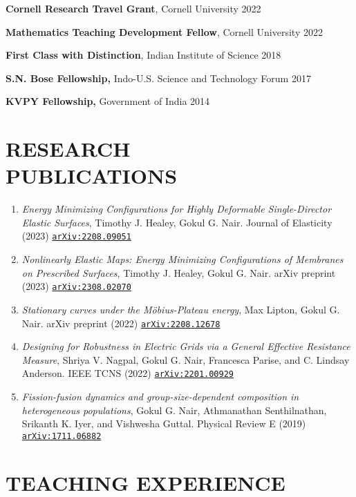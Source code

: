 \documentclass[margin]{res} %
\begin{document}
\begin{resume}
{\bf Cornell Research Travel Grant}, Cornell University \hfill2022

{\bf Mathematics Teaching Development Fellow}, Cornell University \hfill2022

{\bf First Class with Distinction}, Indian Institute of Science \hfill2018

{\bf S.N. Bose Fellowship,} Indo-U.S. Science and Technology Forum \hfill2017

{\bf KVPY Fellowship,} Government of India \hfill2014

\section{RESEARCH\\PUBLICATIONS}
\begin{enumerate}
	\item {\sl Energy Minimizing Configurations for Highly Deformable Single-Director Elastic Surfaces}, Timothy J. Healey, Gokul G. Nair. Journal of Elasticity (2023) \href{https://arxiv.org/abs/2208.09051}{\texttt{arXiv:2208.09051}}

	\item {\sl Nonlinearly Elastic Maps: Energy Minimizing Configurations of Membranes on Prescribed Surfaces}, Timothy J. Healey, Gokul G. Nair. arXiv preprint (2023) \href{https://arxiv.org/abs/2308.02070}{\texttt{arXiv:2308.02070}} 
	
	\item {\sl Stationary curves under the M\"obius-Plateau energy}, Max Lipton, Gokul G. Nair. arXiv preprint (2022) \href{https://arxiv.org/abs/2208.12678}{\texttt{arXiv:2208.12678}} 
	 	
	\item {\sl Designing for Robustness in Electric Grids via a General Effective Resistance Measure}, Shriya V. Nagpal, Gokul G. Nair, Francesca Parise, and C. Lindsay Anderson. IEEE TCNS (2022) \href{https://arxiv.org/abs/2201.00929}{\texttt{arXiv:2201.00929}}
	
	\item {\sl Fission-fusion dynamics and group-size-dependent composition in heterogeneous populations}, Gokul G. Nair, Athmanathan Senthilnathan, Srikanth K. Iyer, and Vishwesha Guttal. Physical Review E (2019) \href{https://arxiv.org/abs/1711.06882}{\texttt{arXiv:1711.06882}}
\end{enumerate}

\section{TEACHING EXPERIENCE}


\end{resume}
\end{document}
